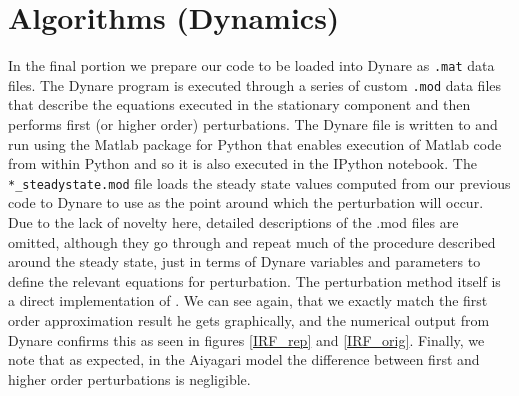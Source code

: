 \documentclass[11pt]{article}
\newcommand{\code}[1]{\texttt{#1}}
\begin{document}
 \section{Algorithms (Dynamics)} 
In the final portion we prepare our code to be loaded into Dynare as \code{.mat} data files. The Dynare program is executed through a series of custom \code{.mod} data files that describe the equations executed in the stationary component and then performs first (or higher order) perturbations. The Dynare file is written to and run using the Matlab package for Python that enables execution of Matlab code from within Python and so it is also executed in the IPython notebook. The \code{*\_steadystate.mod} file loads the steady state values computed from our previous code to Dynare to use as the point around which the perturbation will occur.
Due to the lack of novelty here, detailed descriptions of the .mod files are omitted, although they go through and repeat much of the procedure described around the steady state, just in terms of Dynare variables and parameters to define the relevant equations for perturbation. The perturbation method itself is a direct implementation of \cite{Schmitt-Grohe2004}. 
We can see again, that we exactly match the first order approximation result he gets graphically, and the numerical output from Dynare confirms this as seen in  figures \ref{IRF_rep} and \ref{IRF_orig}. Finally, we note that as expected, in the Aiyagari model the difference between first and higher order perturbations is negligible. 
\end{document}
